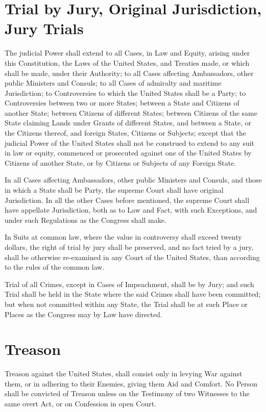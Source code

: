 \documentclass{constitution}
\begin{document}
\section{Trial by Jury, Original Jurisdiction, Jury Trials}
The judicial Power shall extend
to all Cases, in Law and Equity, arising under this Constitution,
	the Laws of the United States,
and	Treaties made, or which shall be made, under their Authority;
to all Cases affecting Ambassadors, other public Ministers and Consuls;
to all Cases of admiralty and maritime Jurisdiction;
to Controversies to which the United States shall be a Party;
to Controversies between two or more States;
between a State and Citizens of another State;
between Citizens of different States;
between Citizens of the same State claiming Lands under Grants of different States,
and between a State, or the Citizens thereof, and foreign States, Citizens or Subjects;
except that the judicial Power of the United States shall not be construed to extend
to any suit in law or equity,
commenced or prosecuted against one of the United States
by Citizens of another State,
or by Citizens or Subjects of any Foreign State.

In all Cases affecting Ambassadors, other public Ministers and Consuls,
and those in which a State shall be Party,
the supreme Court shall have original Jurisdiction.
In all the other Cases before mentioned,
the supreme Court shall have appellate Jurisdiction, both as to Law and Fact,
with such Exceptions, and under such Regulations as the Congress shall make.

In Suits at common law, where the value in controversy shall exceed twenty dollars,
the right of trial by jury shall be preserved,
and no fact tried by a jury, shall be otherwise re-examined in any Court of the United States,
than according to the rules of the common law.

Trial of all Crimes, except in Cases of Impeachment, shall be by Jury;
and such Trial shall be held in the State where the said Crimes shall have been committed;
but when not committed within any State,
the Trial shall be at such Place or Places as the Congress may by Law have directed.

\section{Treason}
Treason against the United States, shall consist only in levying War against them,
or in adhering to their Enemies, giving them Aid and Comfort.
No Person shall be convicted of Treason
unless on the Testimony of two Witnesses to the same overt Act,
or on Confession in open Court.
\end{document}
